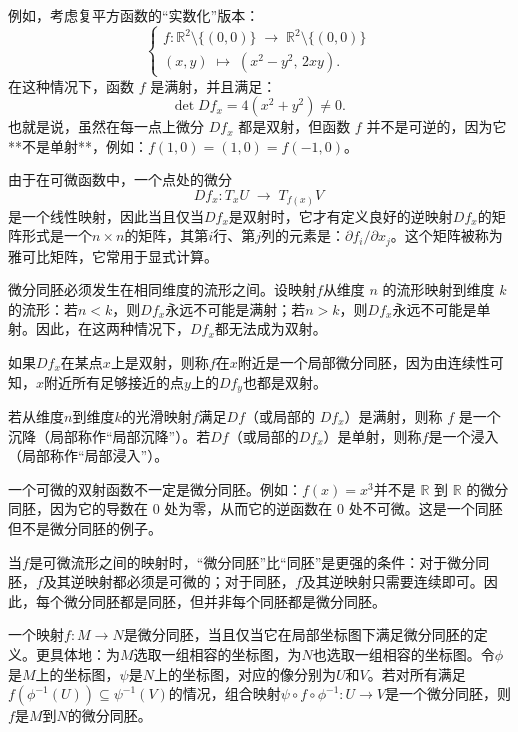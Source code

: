 例如，考虑复平方函数的“实数化”版本：
  $$
  \begin{cases}
  f:\mathbb{R}^2 \setminus \{(0,0)\} \;\to\; \mathbb{R}^2 \setminus \{(0,0)\}\\
  (x,y) \;\mapsto\; (x^2 - y^2,\, 2xy).
  \end{cases}~
  $$
在这种情况下，函数 $f$ 是满射，并且满足：
  $$
  \det Df_x = 4(x^2 + y^2) \neq 0.~
  $$
也就是说，虽然在每一点上微分 $Df_x$ 都是双射，但函数 $f$ 并不是可逆的，因为它**不是单射**，例如：$f(1,0) = (1,0) = f(-1,0)$。

由于在可微函数中，一个点处的微分
  $$
  Df_x: T_xU \;\to\; T_{f(x)}V~
  $$
是一个线性映射，因此当且仅当$Df_x$是双射时，它才有定义良好的逆映射$Df_x$的矩阵形式是一个$n \times n$的矩阵，其第$i$行、第$j$列的元素是：$\partial f_i/\partial x_j$。这个矩阵被称为雅可比矩阵，它常用于显式计算。

微分同胚必须发生在相同维度的流形之间。设映射$f$从维度 $n$ 的流形映射到维度 $k$ 的流形：若$n < k$，则$Df_x$永远不可能是满射；若$n > k$，则$Df_x$永远不可能是单射。因此，在这两种情况下，$Df_x$都无法成为双射。

如果$Df_x$在某点$x$上是双射，则称$f$在$x$附近是一个局部微分同胚，因为由连续性可知，$x$附近所有足够接近的点$y$上的$Df_y$也都是双射。

若从维度$n$到维度$k$的光滑映射$f$满足$Df$（或局部的 $Df_x$）是满射，则称 $f$ 是一个沉降（局部称作“局部沉降”）。若$Df$（或局部的$Df_x$）是单射，则称$f$是一个浸入（局部称作“局部浸入”）。

一个可微的双射函数不一定是微分同胚。例如：$f(x) = x^3$并不是 $\mathbb{R}$ 到 $\mathbb{R}$ 的微分同胚，因为它的导数在 $0$ 处为零，从而它的逆函数在 $0$ 处不可微。这是一个同胚但不是微分同胚的例子。

当$f$是可微流形之间的映射时，“微分同胚”比“同胚”是更强的条件：对于微分同胚，$f$及其逆映射都必须是可微的；对于同胚，$f$及其逆映射只需要连续即可。因此，每个微分同胚都是同胚，但并非每个同胚都是微分同胚。

一个映射$f: M \to N$是微分同胚，当且仅当它在局部坐标图下满足微分同胚的定义。更具体地：为$M$选取一组相容的坐标图，为$N$也选取一组相容的坐标图。令$\phi$ 是$M$上的坐标图，$\psi$是$N$上的坐标图，对应的像分别为$U$和$V$。若对所有满足$f(\phi^{-1}(U)) \subseteq \psi^{-1}(V)$的情况，组合映射$\psi \circ f \circ \phi^{-1}: U \to V$是一个微分同胚，则$f$是$M$到$N$的微分同胚。
